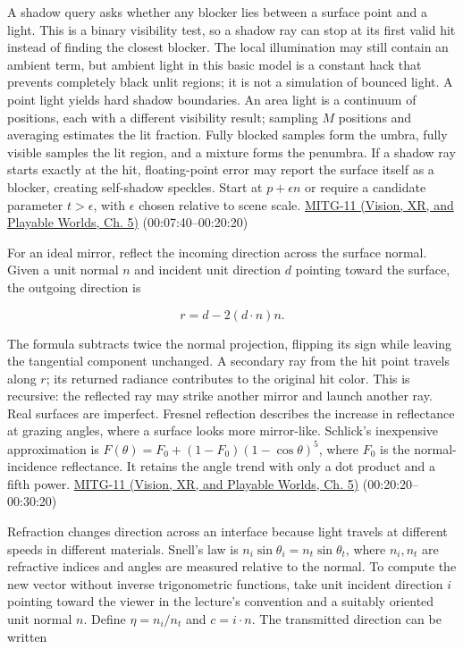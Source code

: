 A shadow query asks whether any blocker lies between a surface point and a light. This is a binary visibility test, so a shadow ray can stop at its first valid hit instead of finding the closest blocker. The local illumination may still contain an ambient term, but ambient light in this basic model is a constant hack that prevents completely black unlit regions; it is not a simulation of bounced light. A point light yields hard shadow boundaries. An area light is a continuum of positions, each with a different visibility result; sampling \(M\) positions and averaging estimates the lit fraction. Fully blocked samples form the umbra, fully visible samples the lit region, and a mixture forms the penumbra. If a shadow ray starts exactly at the hit, floating-point error may report the surface itself as a blocker, creating self-shadow speckles. Start at \(p+\epsilon n\) or require a candidate parameter \(t>\epsilon\), with \(\epsilon\) chosen relative to scene scale. \href{../07-Vision-XR-and-Playable-Worlds/main.pdf\#nameddest=04-visual-computing-ii-ch036-mitg-11---ray-tracing}{MITG-11 (Vision, XR, and Playable Worlds, Ch. 5)} (00:07:40--00:20:20)

For an ideal mirror, reflect the incoming direction across the surface normal. Given a unit normal \(n\) and incident unit direction \(d\) pointing toward the surface, the outgoing direction is

\[
r=d-2(d\cdot n)n.
\]

The formula subtracts twice the normal projection, flipping its sign while leaving the tangential component unchanged. A secondary ray from the hit point travels along \(r\); its returned radiance contributes to the original hit color. This is recursive: the reflected ray may strike another mirror and launch another ray. Real surfaces are imperfect. Fresnel reflection describes the increase in reflectance at grazing angles, where a surface looks more mirror-like. Schlick's inexpensive approximation is \(F(\theta)=F_0+(1-F_0)(1-\cos\theta)^5\), where \(F_0\) is the normal-incidence reflectance. It retains the angle trend with only a dot product and a fifth power. \href{../07-Vision-XR-and-Playable-Worlds/main.pdf\#nameddest=04-visual-computing-ii-ch036-mitg-11---ray-tracing}{MITG-11 (Vision, XR, and Playable Worlds, Ch. 5)} (00:20:20--00:30:20)

Refraction changes direction across an interface because light travels at different speeds in different materials. Snell's law is \(n_i\sin\theta_i=n_t\sin\theta_t\), where \(n_i,n_t\) are refractive indices and angles are measured relative to the normal. To compute the new vector without inverse trigonometric functions, take unit incident direction \(i\) pointing toward the viewer in the lecture's convention and a suitably oriented unit normal \(n\). Define \(\eta=n_i/n_t\) and \(c=i\cdot n\). The transmitted direction can be written


